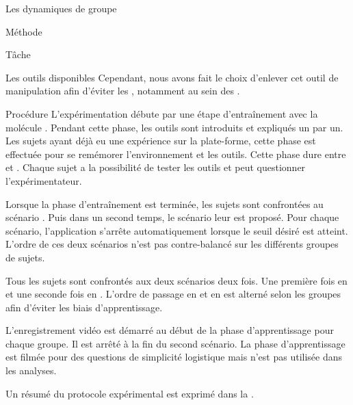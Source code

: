 \documentclass[myfrancais]{mythesis}
\begin{document}
\begin{mychapter}{Les dynamiques de groupe}
\begin{mysection}{Méthode}
\begin{mysubsection}{Tâche}
\begin{mysubsubsection}{Les outils disponibles}
					Cependant, nous avons fait le choix d'enlever cet outil de manipulation afin d'éviter les , notamment au sein des .
				\end{mysubsubsection}
			\end{mysubsection}
			\begin{mysubsection}{Procédure}
				L'expérimentation débute par une étape d'entraînement avec la molécule \myTRPCAGE.
				Pendant cette phase, les outils sont introduits et expliqués un par un.
				Les sujets ayant déjà eu une expérience sur la plate-forme, cette phase est effectuée pour se remémorer l'environnement et les outils.
				Cette phase dure entre  et .
				Chaque sujet a la possibilité de tester les outils et peut questionner l'expérimentateur.

				Lorsque la phase d'entraînement est terminée, les sujets sont confrontées au scénario .
				Puis dans un second temps, le scénario  leur est proposé.
				Pour chaque scénario, l'application s'arrête automatiquement lorsque le seuil  désiré est atteint.
				L'ordre de ces deux scénarios n'est pas contre-balancé sur les différents groupes de sujets.

				Tous les sujets sont confrontés aux deux scénarios deux fois.
				Une première fois en  et une seconde fois en .
				L'ordre de passage en  et en  est alterné selon les groupes afin d'éviter les biais d'apprentissage.

				L'enregistrement vidéo est démarré au début de la phase d'apprentissage pour chaque groupe.
				Il est arrêté à la fin du second scénario.
				La phase d'apprentissage est filmée pour des questions de simplicité logistique mais n'est pas utilisée dans les analyses.

				Un résumé du protocole expérimental est exprimé dans la .


\end{mysubsection}
\end{mysection}
\end{mychapter}
\end{document}
